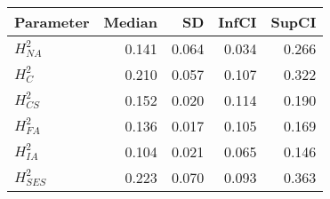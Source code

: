 \begin{table}[ht]
\centering
\begin{tabular}{lrrrr}
  \hline
Parameter & Median & SD & InfCI & SupCI \\ 
  \hline
$H^{2}_{NA}$ & 0.141 & 0.064 & 0.034 & 0.266 \\ 
  $H^{2}_{C}$ & 0.210 & 0.057 & 0.107 & 0.322 \\ 
  $H^{2}_{CS}$ & 0.152 & 0.020 & 0.114 & 0.190 \\ 
  $H^{2}_{FA}$ & 0.136 & 0.017 & 0.105 & 0.169 \\ 
  $H^{2}_{IA}$ & 0.104 & 0.021 & 0.065 & 0.146 \\ 
  $H^{2}_{SES}$ & 0.223 & 0.070 & 0.093 & 0.363 \\ 
   \hline
\end{tabular}
\end{table}
